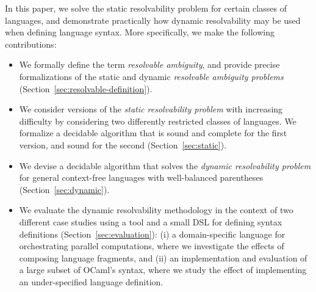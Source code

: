 \documentclass[acmsmall,review,anonymous]{acmart}\settopmatter{printfolios=true,printccs=false,printacmref=false}
\begin{document}



In this paper, we solve the static resolvability problem for certain classes of languages, and demonstrate practically how dynamic resolvability may be used when defining language syntax. More specifically, we make the following contributions:

\begin{itemize}
\item We formally define the term \emph{resolvable ambiguity}, and
  provide precise formalizations of the static and dynamic
  \emph{resolvable ambiguity problems}
  (Section~\ref{sec:resolvable-definition}).
\item We consider versions of the \emph{static resolvability
    problem} with increasing difficulty by considering two
  differently restricted classes of languages. We formalize a
  decidable algorithm that is sound and complete for the first
  version, and sound for the second (Section~\ref{sec:static}).
\item We devise a decidable algorithm that solves the
  \emph{dynamic resolvability problem} for general context-free
  languages with well-balanced parentheses
  (Section~\ref{sec:dynamic}).
\item We evaluate the dynamic resolvability methodology in the context of two
  different case studies using a tool and a small DSL for defining
  syntax definitions (Section~\ref{sec:evaluation}): (i) a
  domain-specific language for orchestrating parallel
  computations, where we investigate the effects of composing
  language fragments, and (ii) an implementation and evaluation of
  a large subset of OCaml's syntax, where we study the effect of
  implementing an under-specified language definition.
\end{itemize}
\end{document}
